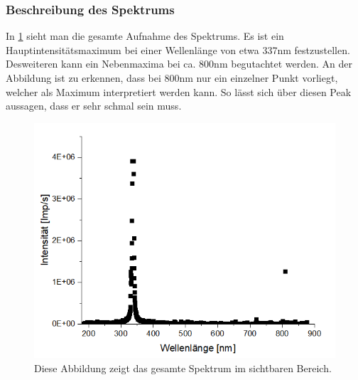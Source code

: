 \documentclass[
	a4paper,
	12pt,
	pagesize,
	ngerman
]{scrartcl}
\begin{document}
\subsubsection{Beschreibung des Spektrums}
In \cref{Spektrumges} sieht man die gesamte Aufnahme des Spektrums. Es ist ein Hauptintensitätsmaximum bei einer Wellenlänge von etwa 337nm festzustellen. Desweiteren kann ein Nebenmaxima bei ca. 800nm begutachtet werden. An der Abbildung ist zu erkennen, dass bei 800nm nur ein einzelner Punkt vorliegt, welcher als Maximum interpretiert werden kann. So lässt sich über diesen Peak aussagen, dass er sehr schmal sein muss.
\begin{figure}[h!] 
	\centering
	\includegraphics[scale = 1]{gesamt.png}
	\caption{Diese Abbildung zeigt das gesamte Spektrum im sichtbaren Bereich.}
	\label{Spektrumges}
\end{figure}
\end{document}
